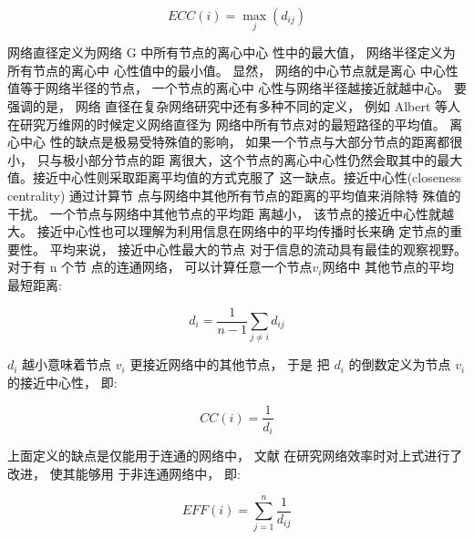 \[ECC(i) = {\max _j}({d_{ij}})\]

				网络直径定义为网络 G 中所有节点的离心中心 性中的最大值， 网络半径定义为所有节点的离心中 心性值中的最小值。 显然， 网络的中心节点就是离心 中心性值等于网络半径的节点， 一个节点的离心中 心性与网络半径越接近就越中心。 要强调的是， 网络 直径在复杂网络研究中还有多种不同的定义， 例如 Albert 等人在研究万维网的时候定义网络直径为 网络中所有节点对的最短路径的平均值\parencite{Miro1997The}。 离心中心 性的缺点是极易受特殊值的影响， 如果一个节点与大部分节点的距离都很小， 只与极小部分节点的距 离很大，这个节点的离心中心性仍然会取其中的最大值。接近中心性则采取距离平均值的方式克服了 这一缺点。接近中心性(closeness centrality) 通过计算节
	点与网络中其他所有节点的距离的平均值来消除特 殊值的干扰。 一个节点与网络中其他节点的平均距 离越小， 该节点的接近中心性就越大。 接近中心性也可以理解为利用信息在网络中的平均传播时长来确
	定节点的重要性。 平均来说， 接近中心性最大的节点 对于信息的流动具有最佳的观察视野。 对于有 n 个节 点的连通网络， 可以计算任意一个节点$v_i$网络中 其他节点的平均最短距离:

\[{d_i} = \frac{1}{{n - 1}}\sum\limits_{j \ne i} {{d_{ij}}} \]

				$d_i$ 越小意味着节点 $v_i$ 更接近网络中的其他节点， 于是 把 $d_i$ 的倒数定义为节点 $v_i$ 的接近中心性， 即:

\[CC(i) = \frac{1}{{{d_i}}}\]

				上面定义的缺点是仅能用于连通的网络中， 文献\parencite{Latora2001Efficient} 在研究网络效率时对上式进行了改进， 使其能够用 于非连通网络中， 即:

\[EFF(i) = \sum\limits_{j = 1}^n {\frac{1}{{{d_{ij}}}}} \]

